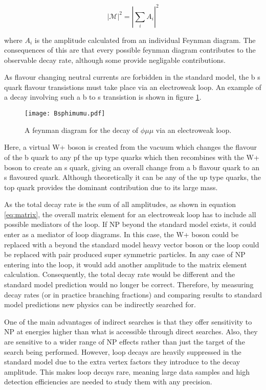 \begin{equation}
  \label{eq:matrix}
  |\mathscr{M}|^2=|\sum_i A_i|^2
\end{equation}

where $A_i$ is the amplitude calculated from an individual Feynman diagram.  The consequences of this are that every possible feynman diagram contributes to the observable decay rate, although some provide negligable contributions.

As flavour changing neutral currents are forbidden in the standard model, the b \to s quark flavour transistions must take place via an electroweak loop.  An example of a decay involving such a b to s transistion is shown in figure \ref{fig:btos}.

\begin{figure}
  \centering
  \texttt{[image: Bsphimumu.pdf]}
  \caption{A feynman diagram for the decay of \Bs \to $\phi \mu \mu$ via an electroweak loop.}
  \label{fig:btos}
\end{figure}

Here, a virtual W+ boson is created from the vacuum which changes the flavour of the b quark to any pf the up type quarks which then recombines with the W+ boson to create an s quark, giving an overall change from a b flavour quark to an s flavoured quark.  Although theoretically it can be any of the up type quarks, the top quark provides the dominant contribution due to its large mass.

As the total decay rate is the sum of all amplitudes, as shown in equation \ref{eq:matrix}, the overall matrix element for an electroweak loop has to include all possible mediators of the loop.  If NP beyond the standard model exists, it could enter as a mediator of loop diagrams.  In this case, the W+ boson could be replaced with a beyond the standard model heavy vector boson or the loop could be replaced with pair produced super symmetric particles.  In any case of NP entering into the loop, it would add another amplitude to the matrix element calculation.  Consequently, the total decay rate would be different and the standard model prediction would no longer be correct.  Therefore, by measuring decay rates (or in practice branching fractions) and comparing results to standard model predictions new physics can be indirectly searched for.

One of the main advantages of indirect searches is that they offer sensitivity to NP at energies higher than what is accessible through direct searches.  Also, they are sensitive to a wider range of NP effects rather than just the target of the search being performed.  However, loop decays are heavily suppressed in the standard model due to the extra vertex factors they introduce to the decay amplitude.  This makes loop decays rare, meaning large data samples and high detection efficiencies are needed to study them with any precision.








